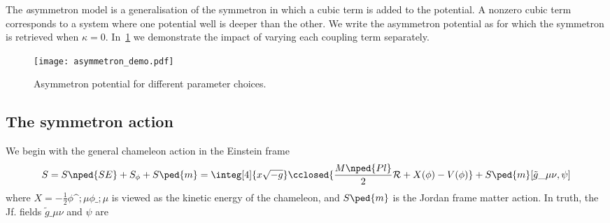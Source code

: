 The \textit{a}symmetron model is a generalisation of the symmetron in which a cubic term is added to the potential. A nonzero cubic term corresponds to a system where one potential well is deeper than the other. We write the asymmetron  potential as
%
for which the symmetron is retrieved when $\kappa=0$. In~\cref{fig:CFTgrav:symmetron:test} we demonstrate the impact of varying each coupling term separately.
\begin{figure}[h]\label{fig:CFTgrav:symmetron:test}
    \centering
    \texttt{[image: asymmetron\_demo.pdf]}
    \caption{Asymmetron potential for different parameter choices.}
\end{figure}



\subsection{The symmetron action}
% 



We begin with the general chameleon action in the Einstein frame
\begin{equation}
    S =S\nped{SE} + S_\phi  + S\ped{m}= \integ[4]{x\sqrt{-g}} \cclosed{ \frac{M\nped{Pl}}{2} \mathcal{R} + X(\phi) - V(\phi)} + S\ped{m}[\tilde{g}\_{\mu\nu} , \psi]
\end{equation} 
where $X = -\frac{1}{2} \phi\^{;\mu} \phi\_{;\mu}$ %
is viewed as the kinetic energy of the chameleon, and $S\ped{m}$ is the Jordan frame matter action. In truth, the Jf. fields $\tilde{g}\_{\mu\nu}$ and $\psi$ are%


